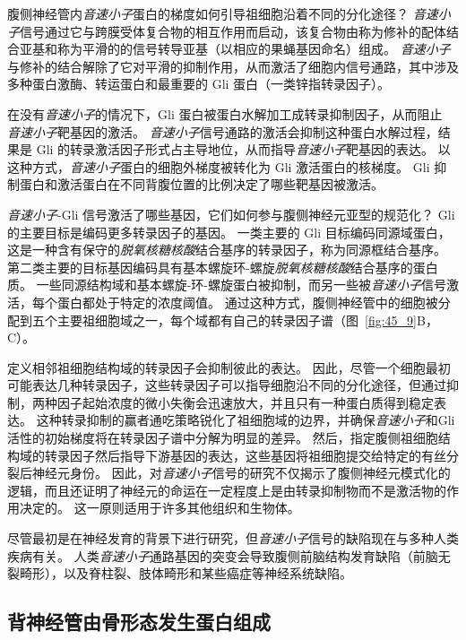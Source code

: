 腹侧神经管内\textit{音速小子}蛋白的梯度如何引导祖细胞沿着不同的分化途径？
\textit{音速小子}信号通过它与跨膜受体复合物的相互作用而启动，该复合物由称为修补的配体结合亚基和称为平滑的的信号转导亚基（以相应的果蝇基因命名）组成。
\textit{音速小子}与修补的结合解除了它对平滑的抑制作用，从而激活了细胞内信号通路，其中涉及多种蛋白激酶、转运蛋白和最重要的 Gli 蛋白（一类锌指转录因子）。


在没有\textit{音速小子}的情况下，Gli 蛋白被蛋白水解加工成转录抑制因子，从而阻止 \textit{音速小子}靶基因的激活。
\textit{音速小子}信号通路的激活会抑制这种蛋白水解过程，结果是 Gli 的转录激活因子形式占主导地位，从而指导\textit{音速小子}靶基因的表达。
以这种方式，\textit{音速小子}蛋白的细胞外梯度被转化为 Gli 激活蛋白的核梯度。
Gli 抑制蛋白和激活蛋白在不同背腹位置的比例决定了哪些靶基因被激活。


\textit{音速小子}-Gli 信号激活了哪些基因，它们如何参与腹侧神经元亚型的规范化？
Gli 的主要目标是编码更多转录因子的基因。
一类主要的 Gli 目标编码同源域蛋白，这是一种含有保守的\textit{脱氧核糖核酸}结合基序的转录因子，称为同源框结合基序。
第二类主要的目标基因编码具有基本螺旋环-螺旋\textit{脱氧核糖核酸}结合基序的蛋白质。
一些同源结构域和基本螺旋-环-螺旋蛋白被抑制，而另一些被\textit{音速小子}信号激活，每个蛋白都处于特定的浓度阈值。
通过这种方式，腹侧神经管中的细胞被分配到五个主要祖细胞域之一，每个域都有自己的转录因子谱（图~\ref{fig:45_9}B，C）。


定义相邻祖细胞结构域的转录因子会抑制彼此的表达。
因此，尽管一个细胞最初可能表达几种转录因子，这些转录因子可以指导细胞沿不同的分化途径，但通过抑制，两种因子起始浓度的微小失衡会迅速放大，并且只有一种蛋白质得到稳定表达。
这种转录抑制的赢者通吃策略锐化了祖细胞域的边界，并确保\textit{音速小子}和Gli活性的初始梯度将在转录因子谱中分解为明显的差异。
然后，指定腹侧祖细胞结构域的转录因子然后指导下游基因的表达，这些基因将祖细胞提交给特定的有丝分裂后神经元身份。
因此，对\textit{音速小子}信号的研究不仅揭示了腹侧神经元模式化的逻辑，而且还证明了神经元的命运在一定程度上是由转录抑制物而不是激活物的作用决定的。
这一原则适用于许多其他组织和生物体。


尽管最初是在神经发育的背景下进行研究，但\textit{音速小子}信号的缺陷现在与多种人类疾病有关。
人类\textit{音速小子}通路基因的突变会导致腹侧前脑结构发育缺陷（前脑无裂畸形），以及脊柱裂、肢体畸形和某些癌症等神经系统缺陷。



\subsection{背神经管由骨形态发生蛋白组成}

